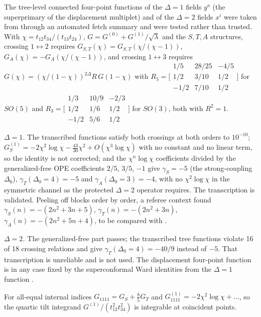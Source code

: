 The tree-level connected four-point functions of the $\Delta=1$ fields $y^a$ (the superprimary of the displacement
multiplet) and of the $\Delta=2$ fields $x^i$ were taken from \cite{GRT} through an automated fetch summary and were
tested rather than trusted. With $\chi=t_{12}t_{34}/(t_{13}t_{24})$, $G=G^{(0)}+G^{(1)}/\sqrt\lambda$ and the $S,T,A$
structures, crossing $1\leftrightarrow2$ requires $G_{S,T}(\chi)=G_{S,T}(\chi/(\chi-1))$, $G_A(\chi)=-G_A(\chi/(\chi-1))$,
and crossing $1\leftrightarrow3$ requires $G(\chi)=(\chi/(1-\chi))^{2\Delta}R\,G(1-\chi)$ with
$R_5=\big[\begin{smallmatrix}1/5&28/25&-4/5\\1/2&3/10&1/2\\-1/2&7/10&1/2\end{smallmatrix}\big]$ for $SO(5)$ and
$R_3=\big[\begin{smallmatrix}1/3&10/9&-2/3\\1/2&1/6&1/2\\-1/2&5/6&1/2\end{smallmatrix}\big]$ for $SO(3)$, both with $R^2=1$.

\emph{$\Delta=1$.} The transcribed functions satisfy both crossings at both orders to $10^{-10}$;
$G_S^{(1)}=-2\chi^2\log\chi-\frac{43}{30}\chi^2+O(\chi^3\log\chi)$ with no constant and no linear term, so the identity is
not corrected; and the $\chi^n\log\chi$ coefficients divided by the generalized-free OPE coefficients $2/5$, $3/5$,
$-1$ give $\gamma_S=-5$ (the strong-coupling $\Delta_6$), $\gamma_T(\Delta_0=4)=-5$ and $\gamma_A(\Delta_0=3)=-4$, with no
$\chi^2\log\chi$ in the symmetric channel as the protected $\Delta=2$ operator requires. The transcription is validated.
Peeling off blocks order by order, a referee context found $\gamma_S(n)=-(2n^2+3n+5)$, $\gamma_T(n)=-(2n^2+3n)$,
$\gamma_A(n)=-(2n^2+5n+4)$, to be compared with \cite{GRT}.

\emph{$\Delta=2$.} The generalized-free part passes; the transcribed tree functions violate 16 of 18 crossing relations
and give $\gamma_T(\Delta_0=4)=-40/9$ instead of $-5$. That transcription is unreliable and is not used. The
displacement four-point function is in any case fixed by the superconformal Ward identities from the $\Delta=1$
function \cite{LMM,FerreroMeneghelli}.

For all-equal internal indices $G_{1111}=G_S+\tfrac85G_T$ and $G^{(1)}_{1111}=-2\chi^2\log\chi+\dots$, so the quartic
tilt integrand $G^{(1)}/(t_{12}^2t_{34}^2)$ is integrable at coincident points.


